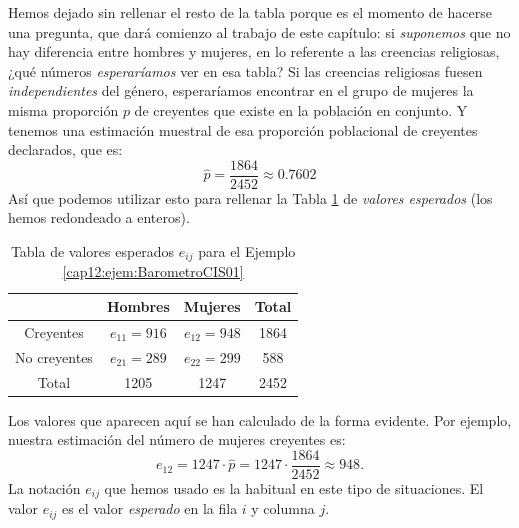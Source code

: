 \begin{ejemplo}
Hemos dejado sin rellenar el resto de la tabla porque es el momento de hacerse una pregunta, que dará comienzo al trabajo de este capítulo: si {\em suponemos} que no hay diferencia entre hombres y mujeres, en lo referente a las creencias religiosas, ¿qué números {\em esperaríamos} ver en esa tabla? Si las creencias religiosas fuesen {\em independientes} del género,  esperaríamos encontrar en el grupo de mujeres la misma proporción $p$ de creyentes que existe en la población en conjunto. Y tenemos una estimación muestral de esa proporción poblacional de creyentes declarados, que es:
        \[\hat p=\dfrac{1864}{2452}\approx 0.7602\]
Así que podemos utilizar esto para rellenar la Tabla
\ref{cap12:tabla:valoresEsperadosEjemploBarometroCis} de {\em valores esperados} (los hemos
redondeado a enteros).
\begin{table}[ht]
    \begin{center}
    \begin{tabular}{|c|c|c|c|}
      \hline
       & Hombres & Mujeres & Total \\
       \hline
      Creyentes & $e_{11}=916$ & $e_{12}=948$ & 1864 \\
      \hline
      No creyentes & $e_{21}=289$ & $e_{22}=299$ & 588 \\
      \hline
      Total & 1205 & 1247 & 2452 \\
      \hline
    \end{tabular}
    \end{center}
\caption{Tabla de valores esperados $e_{ij}$ para el Ejemplo \ref{cap12:ejem:BarometroCIS01}}
\label{cap12:tabla:valoresEsperadosEjemploBarometroCis}
\end{table}
Los valores que aparecen aquí se han calculado de la forma evidente. Por ejemplo, nuestra
estimación del número de mujeres creyentes es:
    \[e_{12}=1247\cdot\hat p=1247\cdot\dfrac{1864}{2452}\approx 948.\]
La notación $e_{ij}$ que hemos usado es la habitual en este tipo de situaciones. El valor $e_{ij}$
es el valor {\em esperado} en la fila $i$ y columna $j$.


\end{ejemplo}
